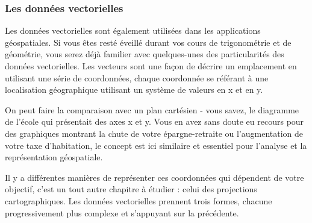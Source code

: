 \subsubsection{Les donn\'ees vectorielles}\label{label_vectordata}

Les donn\'ees vectorielles sont \'egalement utilis\'ees dans les applications g\'eospatiales. Si vous \^etes rest\'e \'eveill\'e durant vos cours de trigonom\'etrie et de g\'eom\'etrie, vous serez d\'ej\`a familier avec quelques-unes des particularit\'es des donn\'ees vectorielles. Les vecteurs sont une fa\c{c}on de d\'ecrire un emplacement en utilisant une s\'erie de coordonn\'ees, chaque coordonn\'ee se r\'ef\'erant \`a une localisation g\'eographique utilisant un syst\`eme de valeurs en x et en y.

On peut faire la comparaison avec un plan cart\'esien - vous savez, le diagramme de l'\'ecole qui pr\'esentait des axes x et y. Vous en avez sans doute eu recours pour des graphiques montrant la chute de votre \'epargne-retraite ou l'augmentation de votre taxe d'habitation, le concept est ici similaire et essentiel pour l'analyse et la repr\'esentation g\'eospatiale.

Il y a diff\'erentes mani\`eres de repr\'esenter ces coordonn\'ees qui d\'ependent de votre objectif, c'est un tout autre chapitre \`a \'etudier : celui des projections cartographiques.
Les donn\'ees vectorielles prennent trois formes, chacune progressivement plus complexe et s'appuyant sur la pr\'ec\'edente.  


